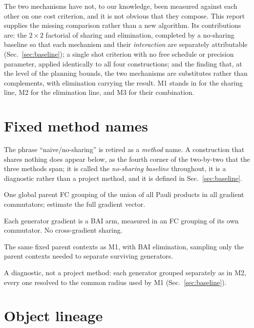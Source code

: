 \documentclass[10pt]{article}
\begin{document}
The two mechanisms have not, to our knowledge, been measured against each other on one cost criterion, and it is not obvious that they compose. This report supplies the missing comparison rather than a new algorithm. Its contributions are: the $2\times2$ factorial of sharing and elimination, completed by a no-sharing baseline so that each mechanism and their \emph{interaction} are separately attributable (Sec.~\ref{sec:baseline}); a single shot criterion with no free schedule or precision parameter, applied identically to all four constructions; and the finding that, at the level of the planning bounds, the two mechanisms are substitutes rather than complements, with elimination carrying the result. M1 stands in for the sharing line, M2 for the elimination line, and M3 for their combination.

\section{Fixed method names}

The phrase ``naive/no-sharing'' is retired as a \emph{method} name. A construction that shares nothing does appear below, as the fourth corner of the two-by-two that the three methods span; it is called the \emph{no-sharing baseline} throughout, it is a diagnostic rather than a project method, and it is defined in Sec.~\ref{sec:baseline}.

\begin{description}[leftmargin=1.2em,itemsep=1pt]
  \item[\textbf{M1: FC-UG}, Fully Commuting Universal Groups.] One global parent FC grouping of the union of all Pauli products in all gradient commutators; estimate the full gradient vector.
  \item[\textbf{M2: BAI-FC-IG}, BAI with FC Individual Gradients.] Each generator gradient is a BAI arm, measured in an FC grouping of its own commutator. No cross-gradient sharing.
  \item[\textbf{M3: BAI-FC-UG}, BAI with FC Universal Groups.] The same fixed parent contexts as M1, with BAI elimination, sampling only the parent contexts needed to separate surviving generators.
  \item[\emph{No-sharing baseline}.] A diagnostic, not a project method: each generator grouped separately as in M2, every one resolved to the common radius used by M1 (Sec.~\ref{sec:baseline}).
\end{description}

\section{Object lineage}
\end{document}
